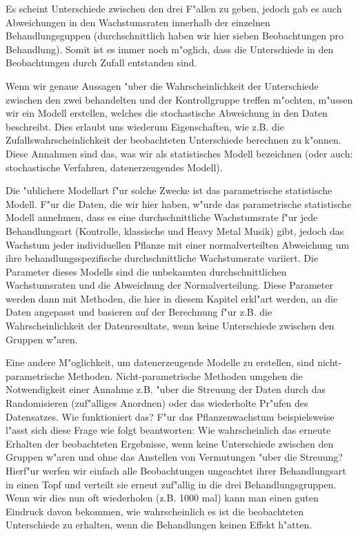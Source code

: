 \documentclass[a4paper,twoside]{tufte-book}\usepackage[]{graphicx}\usepackage[]{color}
\begin{document}
Es scheint Unterschiede zwischen den drei F"allen zu geben, jedoch gab es auch Abweichungen in den Wachstumsraten innerhalb der einzelnen Behandlungsguppen (durchschnittlich haben wir hier sieben Beobachtungen pro Behandlung). Somit ist es immer noch m"oglich, dass die Unterschiede in den Beobachtungen durch Zufall entstanden sind.

Wenn wir genaue Aussagen "uber die Wahrscheinlichkeit der Unterschiede zwischen den zwei behandelten und der Kontrollgruppe treffen m"ochten, m"ussen wir ein Modell erstellen, welches die stochastische Abweichung in den Daten beschreibt. Dies erlaubt uns wiederum Eigenschaften, wie z.B. die Zufallswahrscheinlichkeit der beobachteten Unterschiede berechnen zu k"onnen. Diese Annahmen sind das, was wir als statistisches Modell bezeichnen (oder auch: stochastische Verfahren, datenerzeugendes Modell). 

Die "ublichere Modellart f"ur solche Zwecke ist das parametrische statistische Modell. F"ur die Daten, die wir hier haben, w"urde das parametrische statistische Modell annehmen, dass es eine durchschnittliche Wachstumsrate f"ur jede Behandlungsart (Kontrolle, klassische und Heavy Metal Musik) gibt, jedoch das Wachstum jeder individuellen Pflanze mit einer normalverteilten Abweichung um ihre behandlungsspezifische durchschnittliche Wachstumsrate variiert. Die Parameter dieses Modells sind die unbekannten durchschnittlichen Wachstumsraten und die Abweichung der Normalverteilung. Diese Parameter werden dann mit Methoden, die hier in diesem Kapitel erkl"art werden, an die Daten angepasst und basieren auf der Berechnung f"ur z.B. die Wahrscheinlichkeit der Datenresultate, wenn keine Unterschiede zwischen den Gruppen w"aren.

Eine andere M"oglichkeit, um datenerzeugende Modelle zu erstellen, sind nicht-parametrische Methoden. Nicht-parametrische Methoden umgehen die Notwendigkeit einer Annahme z.B. "uber die Streuung der Daten durch das Randomisieren (zuf"alliges Anordnen) oder das wiederholte Pr"ufen des Datensatzes. Wie funktioniert das? F"ur das Pflanzenwachstum beispielsweise l"asst sich diese Frage wie folgt beantworten: Wie wahrscheinlich das erneute Erhalten der beobachteten Ergebnisse, wenn keine Unterschiede zwischen den Gruppen w"aren und ohne das Anstellen von Vermutungen "uber die Streuung? Hierf"ur werfen wir einfach alle Beobachtungen ungeachtet ihrer Behandlungsart in einen Topf und verteilt sie erneut zuf"allig in die drei Behandlungsgruppen. Wenn wir dies nun oft wiederholen (z.B. 1000 mal) kann man einen guten Eindruck davon bekommen, wie wahrscheinlich es ist die beobachteten Unterschiede zu erhalten, wenn die Behandlungen keinen Effekt h"atten.
\end{document}
